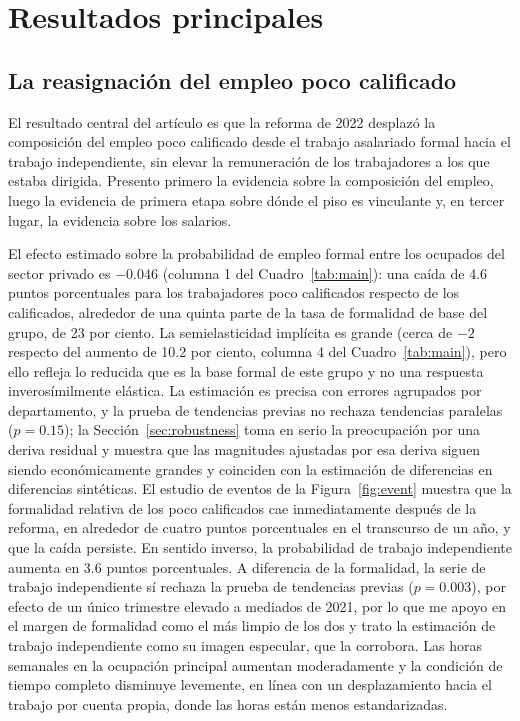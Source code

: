 \section{Resultados principales}\label{sec:results}

\subsection{La reasignación del empleo poco calificado}

El resultado central del artículo es que la reforma de 2022 desplazó la composición del empleo poco calificado desde el trabajo asalariado formal hacia el trabajo independiente, sin elevar la remuneración de los trabajadores a los que estaba dirigida. Presento primero la evidencia sobre la composición del empleo, luego la evidencia de primera etapa sobre dónde el piso es vinculante y, en tercer lugar, la evidencia sobre los salarios.

El efecto estimado sobre la probabilidad de empleo formal entre los ocupados del sector privado es $-0.046$ (columna 1 del Cuadro~\ref{tab:main}): una caída de 4.6 puntos porcentuales para los trabajadores poco calificados respecto de los calificados, alrededor de una quinta parte de la tasa de formalidad de base del grupo, de 23 por ciento. La semielasticidad implícita es grande (cerca de $-2$ respecto del aumento de 10.2 por ciento, columna 4 del Cuadro~\ref{tab:main}), pero ello refleja lo reducida que es la base formal de este grupo y no una respuesta inverosímilmente elástica. La estimación es precisa con errores agrupados por departamento, y la prueba de tendencias previas no rechaza tendencias paralelas ($p=0.15$); la Sección~\ref{sec:robustness} toma en serio la preocupación por una deriva residual y muestra que las magnitudes ajustadas por esa deriva siguen siendo económicamente grandes y coinciden con la estimación de diferencias en diferencias sintéticas. El estudio de eventos de la Figura~\ref{fig:event} muestra que la formalidad relativa de los poco calificados cae inmediatamente después de la reforma, en alrededor de cuatro puntos porcentuales en el transcurso de un año, y que la caída persiste. En sentido inverso, la probabilidad de trabajo independiente aumenta en 3.6 puntos porcentuales. A diferencia de la formalidad, la serie de trabajo independiente sí rechaza la prueba de tendencias previas ($p=0.003$), por efecto de un único trimestre elevado a mediados de 2021, por lo que me apoyo en el margen de formalidad como el más limpio de los dos y trato la estimación de trabajo independiente como su imagen especular, que la corrobora. Las horas semanales en la ocupación principal aumentan moderadamente y la condición de tiempo completo disminuye levemente, en línea con un desplazamiento hacia el trabajo por cuenta propia, donde las horas están menos estandarizadas.

